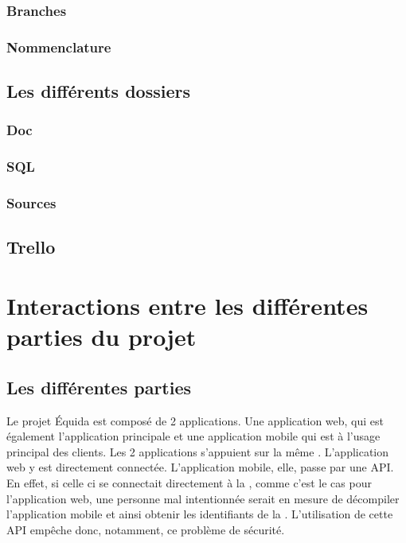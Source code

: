 			\subsubsection{Branches}

			\subsubsection{Nommenclature}

		\subsection{Les différents dossiers}
			\subsubsection{Doc}

			\subsubsection{SQL}

			\subsubsection{Sources}

		\subsection{Trello}

	\section{Interactions entre les différentes parties du projet}
		\subsection{Les différentes parties}
			Le projet Équida est composé de 2 applications. Une application web, qui est également l'application principale et une application mobile qui est à l'usage principal des clients. Les 2 applications s'appuient sur la même \bdd{}. L'application web y est directement connectée. L'application mobile, elle, passe par une API. En effet, si celle ci se connectait directement à la \bdd{}, comme c'est le cas pour l'application web, une personne mal intentionnée serait en mesure de décompiler l'application mobile et ainsi obtenir les identifiants de la \bdd{}. L'utilisation de cette API empêche donc, notamment, ce problème de sécurité.

